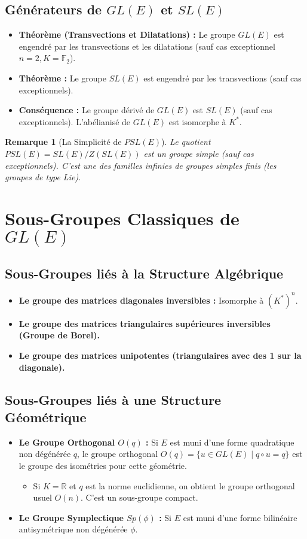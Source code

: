 \documentclass[12pt, a4paper, parskip=full]{report}
\theoremstyle{agregstyle}
\newtheorem{remark}[definition]{Remarque}
\begin{document}
\subsection{Générateurs de $GL(E)$ et $SL(E)$}
\begin{itemize}
    \item \textbf{Théorème (Transvections et Dilatations) :} Le groupe $GL(E)$ est engendré par les transvections et les dilatations (sauf cas exceptionnel $n=2, K=\mathbb{F}_2$).
    \item \textbf{Théorème :} Le groupe $SL(E)$ est engendré par les transvections (sauf cas exceptionnels).
    \item \textbf{Conséquence :} Le groupe dérivé de $GL(E)$ est $SL(E)$ (sauf cas exceptionnels). L'abélianisé de $GL(E)$ est isomorphe à $K^*$.
\end{itemize}
\begin{remark}[La Simplicité de $PSL(E)$]
    Le quotient $PSL(E) = SL(E)/Z(SL(E))$ est un groupe simple (sauf cas exceptionnels). C'est une des familles infinies de groupes simples finis (les groupes de type Lie).
\end{remark}

\section{Sous-Groupes Classiques de $GL(E)$}
\subsection{Sous-Groupes liés à la Structure Algébrique}
\begin{itemize}
    \item \textbf{Le groupe des matrices diagonales inversibles :} Isomorphe à $(K^*)^n$.
    \item \textbf{Le groupe des matrices triangulaires supérieures inversibles (Groupe de Borel).}
    \item \textbf{Le groupe des matrices unipotentes (triangulaires avec des 1 sur la diagonale).}
\end{itemize}

\subsection{Sous-Groupes liés à une Structure Géométrique}
\begin{itemize}
    \item \textbf{Le Groupe Orthogonal $O(q)$ :} Si $E$ est muni d'une forme quadratique non dégénérée $q$, le groupe orthogonal $O(q) = \{ u \in GL(E) \mid q \circ u = q \}$ est le groupe des isométries pour cette géométrie.
        \begin{itemize}
            \item Si $K=\mathbb{R}$ et $q$ est la norme euclidienne, on obtient le groupe orthogonal usuel $O(n)$. C'est un sous-groupe compact.
        \end{itemize}
    \item \textbf{Le Groupe Symplectique $Sp(\phi)$ :} Si $E$ est muni d'une forme bilinéaire antisymétrique non dégénérée $\phi$.
\end{itemize}
\end{document}
